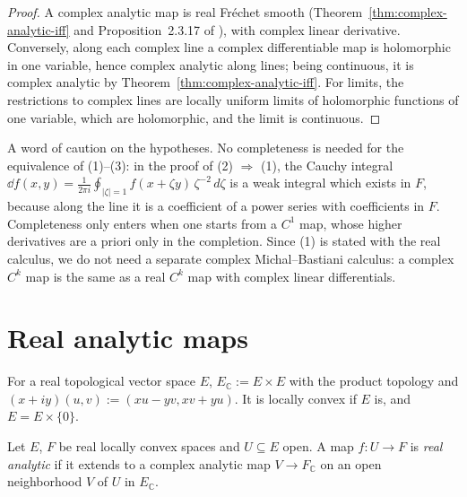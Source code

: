 \begin{proof}
  \leanok
  A complex analytic map is real Fréchet smooth (Theorem~\ref{thm:complex-analytic-iff} and
  Proposition~2.3.17 of \cite{GN26}), with complex linear derivative. Conversely, along each
  complex line a complex differentiable map is holomorphic in one variable, hence complex analytic
  along lines; being continuous, it is complex analytic by Theorem~\ref{thm:complex-analytic-iff}.
  For limits, the restrictions to complex lines are locally uniform limits of holomorphic functions
  of one variable, which are holomorphic, and the limit is continuous.
\end{proof}

\begin{remark}
  A word of caution on the hypotheses. No completeness is needed for the equivalence of (1)--(3):
  in the proof of (2) $\Rightarrow$ (1), the Cauchy integral
  $\dd f(x, y) = \frac{1}{2\pi i} \oint_{|\zeta| = 1} f(x + \zeta y)\, \zeta^{-2}\, d\zeta$ is a
  weak integral which exists in $F$, because along the line it is a coefficient of a power series
  with coefficients in $F$. Completeness only enters when one starts from a $C^1$ map, whose
  higher derivatives are a priori only in the completion. Since (1) is stated with the real
  calculus, we do not need a separate complex Michal--Bastiani calculus: a complex $C^k$ map is
  the same as a real $C^k$ map with complex linear differentials.
\end{remark}

\section{Real analytic maps}

\begin{definition}
  \label{def:complexification}
  \leanok
  For a real topological vector space $E$, $E_{\mathbb{C}} := E \times E$ with the product
  topology and $(x + iy)(u, v) := (xu - yv, xv + yu)$. It is locally convex if $E$ is, and
  $E = E \times \{0\}$.
\end{definition}

\begin{definition}
  \label{def:real-analytic}
  \leanok
  Let $E$, $F$ be real locally convex spaces and $U \subseteq E$ open. A map $f \colon U \to F$ is
  \emph{real analytic} if it extends to a complex analytic map $V \to F_{\mathbb{C}}$ on an open
  neighborhood $V$ of $U$ in $E_{\mathbb{C}}$.
\end{definition}

